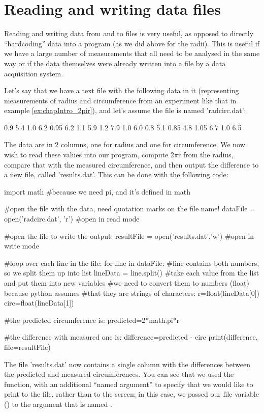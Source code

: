 \section{Reading and writing data files}
Reading and writing data from and to files is very useful, as opposed to directly ``hardcoding'' data into a program (as we did above for the radii). This is useful if we have a large number of measurements that all need to be analysed in the same way or if the data themselves were already written into a file by a data acquisition system.

Let's say that we have a text file with the following data in it (representing measurements of radius and circumference from an experiment like that in example \ref{ex:chapIntro_2pir}), and let's assume the file is named 'radcirc.dat':
\begin{poutput}
0.9   5.4
1.0   6.2
0.95   6.2
1.1   5.9
1.2   7.9
1.0   6.0
0.8   5.1
0.85   4.8
1.05   6.7
1.0   6.5
\end{poutput}
The data are in 2 columns, one for radius and one for circumference. We now wish to read these values into our program, compute 2$\pi$r from the radius, compare that with the measured circumference, and then output the difference to a new file, called 'results.dat'. This can be done with the following code:
\begin{python}[caption = \mbox{}]
import math #because we need pi, and it's defined in math

#open the file with the data, need quotation marks on the file name!
dataFile = open('radcirc.dat', 'r') #open in read mode

#open the file to write the output:
resultFile = open('results.dat','w') #open in write mode

#loop over each line in the file:
for line in dataFile:
  #line contains both numbers, so we split them up into list
  lineData = line.split()
  #take each value from the list and put them into new variables
  #we need to convert them to numbers (float) because python assumes
  #that they are strings of characters:
  r=float(lineData[0])
  circ=float(lineData[1])
  
  #the predicted circumference is:
  predicted=2*math.pi*r
  
  #the difference with measured one is:
  difference=predicted - circ
  print(difference, file=resultFile)

\end{python}
The file 'results.dat' now contains a single column with the differences between the predicted and measured circumferences. You can see that we used the  function, with an additional ``named argument'' to specify that we would like to print to the file, rather than to the screen; in this case, we passed our file variable () to the argument that is named .

